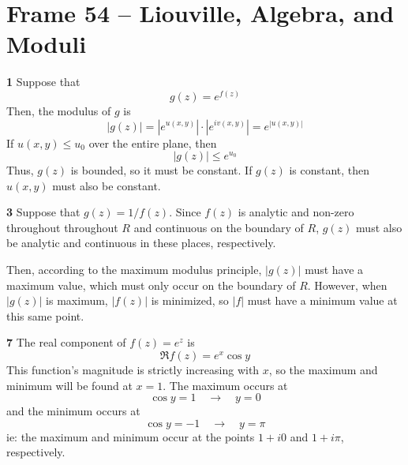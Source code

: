 \documentclass{article}
\begin{document}
\clearpage
\section{Frame 54 -- Liouville, Algebra, and Moduli}
\textbf{1}
Suppose that
\[
	g(z) = e^{f(z)}
\]
Then, the modulus of $g$ is
\[
	|g(z)| = |e^{u(x, y)}| \cdot |e^{iv(x, y)}| = e^{|u(x, y)|}
\]
If $u(x, y) \le u_0$ over the entire plane, then
\[
	|g(z)| \le e^{u_0} 
\]
Thus, $g(z)$ is bounded, so it must be constant. If $g(z)$ is constant, then $u(x, y)$ must also be constant.

\textbf{3}
Suppose that $g(z) = 1 / f(z)$. Since $f(z)$ is analytic and non-zero throughout throughout $R$ and continuous on the boundary of $R$, $g(z)$ must also be analytic and continuous in these places, respectively. 

Then, according to the maximum modulus principle, $|g(z)|$ must have a maximum value, which must only occur on the boundary of $R$. However, when $|g(z)|$ is maximum, $|f(z)|$ is minimized, so $|f|$ must have a minimum value at this same point.

\textbf{7}
The real component of $f(z) = e^z$ is
\[
	\Re f(z) = e^x \cos y
\]
This function's magnitude is strictly increasing with $x$, so the maximum and minimum will be found at $x = 1$. The maximum occurs at
\[
	\cos y = 1 \quad \to \quad y = 0
\]
and the minimum occurs at
\[
	\cos y = -1 \quad \to \quad y = \pi
\]
ie: the maximum and minimum occur at the points $1 + i0$ and $1 + i\pi$, respectively.
\end{document}
